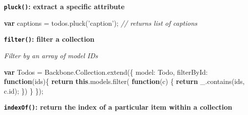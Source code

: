 \documentclass[9pt]{book}
\newenvironment{Shaded}{}{}
\newcommand{\KeywordTok}[1]{\textcolor[rgb]{0.00,0.44,0.13}{\textbf{{#1}}}}
\newcommand{\DataTypeTok}[1]{\textcolor[rgb]{0.56,0.13,0.00}{{#1}}}
\newcommand{\StringTok}[1]{\textcolor[rgb]{0.25,0.44,0.63}{{#1}}}
\newcommand{\CommentTok}[1]{\textcolor[rgb]{0.38,0.63,0.69}{\textit{{#1}}}}
\newcommand{\OtherTok}[1]{\textcolor[rgb]{0.00,0.44,0.13}{{#1}}}
\newcommand{\FunctionTok}[1]{\textcolor[rgb]{0.02,0.16,0.49}{{#1}}}
\newcommand{\NormalTok}[1]{{#1}}
\begin{document}
\textbf{\texttt{pluck()}: extract a specific attribute}

\begin{Shaded}
\begin{Highlighting}[]
\KeywordTok{var} \NormalTok{captions = }\OtherTok{todos}\NormalTok{.}\FunctionTok{pluck}\NormalTok{(}\StringTok{'caption'}\NormalTok{);}
\CommentTok{// returns list of captions}
\end{Highlighting}
\end{Shaded}

\textbf{\texttt{filter()}: filter a collection}

\emph{Filter by an array of model IDs}

\begin{Shaded}
\begin{Highlighting}[]
\KeywordTok{var} \NormalTok{Todos = }\OtherTok{Backbone}\NormalTok{.}\OtherTok{Collection}\NormalTok{.}\FunctionTok{extend}\NormalTok{(\{}
  \DataTypeTok{model}\NormalTok{: Todo,}
  \DataTypeTok{filterById}\NormalTok{: }\KeywordTok{function}\NormalTok{(ids)\{}
    \KeywordTok{return} \KeywordTok{this}\NormalTok{.}\OtherTok{models}\NormalTok{.}\FunctionTok{filter}\NormalTok{(}
      \KeywordTok{function}\NormalTok{(c) \{ }
        \KeywordTok{return} \OtherTok{_}\NormalTok{.}\FunctionTok{contains}\NormalTok{(ids, }\OtherTok{c}\NormalTok{.}\FunctionTok{id}\NormalTok{); }
      \NormalTok{\})}
  \NormalTok{\}}
\NormalTok{\});}
\end{Highlighting}
\end{Shaded}

\textbf{\texttt{indexOf()}: return the index of a particular item within
a collection}
\end{document}
